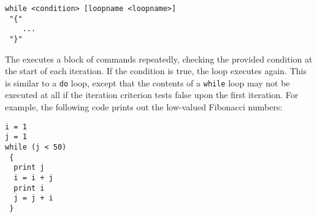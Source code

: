 \begin{verbatim}
while <condition> [loopname <loopname>]
 "{"
    ...
 "}"
\end{verbatim}

The  executes a block of commands repeatedly, checking the
provided condition at the start of each iteration. If the condition is true,
the loop executes again. This is similar to a {\tt do} loop, except that the
contents of a {\tt while} loop may not be executed at all if the iteration
criterion tests false upon the first iteration. For example, the following code
prints out the low-valued Fibonacci numbers:

\begin{verbatim}
i = 1
j = 1
while (j < 50)
 {
  print j
  i = i + j
  print i
  j = j + i
 }
\end{verbatim}

